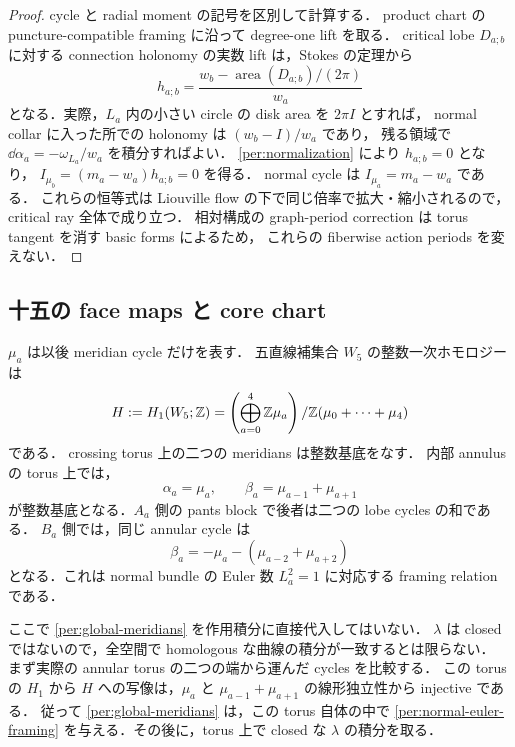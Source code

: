 \begin{proof}
cycle と radial moment の記号を区別して計算する．
product chart の puncture-compatible framing に沿って degree-one lift を取る．
critical lobe $D_{a;b}$ に対する connection holonomy の実数 lift は，Stokes の定理から
\begin{equation}\label{per:holonomy-lobe}
 h_{a;b}=
 \frac{w_b-\operatorname{area}(D_{a;b})/(2\pi)}{w_a}
\end{equation}
となる．実際，$L_a$ 内の小さい circle の disk area を $2\pi I$ とすれば，
normal collar に入った所での holonomy は $(w_b-I)/w_a$ であり，
残る領域で $\dd\alpha_a=-\omega_{L_a}/w_a$ を積分すればよい．
\eqref{per:normalization} により $h_{a;b}=0$ となり，
$I_{\mu_b}=(m_a-w_a)h_{a;b}=0$ を得る．
normal cycle は $I_{\mu_a}=m_a-w_a$ である．
これらの恒等式は Liouville flow の下で同じ倍率で拡大・縮小されるので，critical ray 全体で成り立つ．
相対構成の graph-period correction は torus tangent を消す basic forms によるため，
これらの fiberwise action periods を変えない．
\end{proof}

\subsection{十五の face maps と core chart}

$\mu_a$ は以後 meridian cycle だけを表す．
五直線補集合 $W_5$ の整数一次ホモロジーは
\begin{equation}\label{per:global-meridians}
 H:=H_1(W_5;\mathbb Z)
  =\left(\bigoplus_{a=0}^4\mathbb Z\mu_a\right)
     /\mathbb Z(\mu_0+\cdots+\mu_4)
\end{equation}
である\cite{Hattori,PapadimaSuciu}．
crossing torus 上の二つの meridians は整数基底をなす．
内部 annulus の torus 上では，
\[
 \alpha_a=\mu_a,\qquad
 \beta_a=\mu_{a-1}+\mu_{a+1}
\]
が整数基底となる．$A_a$ 側の pants block で後者は二つの lobe cycles の和である．
$B_a$ 側では，同じ annular cycle は
\begin{equation}\label{per:normal-euler-framing}
 \beta_a=-\mu_a-(\mu_{a-2}+\mu_{a+2})
\end{equation}
となる．これは normal bundle の Euler 数 $L_a^2=1$ に対応する framing relation である．

ここで \eqref{per:global-meridians} を作用積分に直接代入してはいない．
$\lambda$ は closed ではないので，全空間で homologous な曲線の積分が一致するとは限らない．
まず実際の annular torus の二つの端から運んだ cycles を比較する．
この torus の $H_1$ から $H$ への写像は，$\mu_a$ と $\mu_{a-1}+\mu_{a+1}$ の線形独立性から injective である．
従って \eqref{per:global-meridians} は，この torus 自体の中で
\eqref{per:normal-euler-framing} を与える．その後に，torus 上で closed な $\lambda$ の積分を取る．

